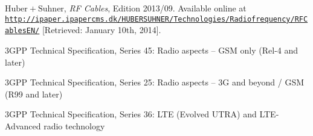 \documentclass[a4paper, 12pt]{article}
\begin{document}
\newpage
\begin{thebibliography}{9}%

 $\mathrm{Huber}+\mathrm{Suhner}$, 
	\textit{RF Cables}, 
	Edition 2013/09. 
	Available online at \href{http://ipaper.ipapercms.dk/HUBERSUHNER/Technologies/Radiofrequency/RFCablesEN/}
		{\texttt{http://ipaper.\linebreak{}ipapercms.dk/HUBERSUHNER/Technologies/Radiofrequency/RFCablesEN/}}
	[Retrieved: January 10th, 2014].
	
 3GPP Technical Specification, Series 45: 
	Radio aspects -- GSM only (Rel-4 and later)
	
 3GPP Technical Specification, Series 25: 
	Radio aspects -- 3G and beyond / GSM (R99 and later)
	
 3GPP Technical Specification, Series 36: 
	LTE (Evolved UTRA) and LTE-Advanced radio technology

	

	
	

\end{thebibliography}
\end{document}
